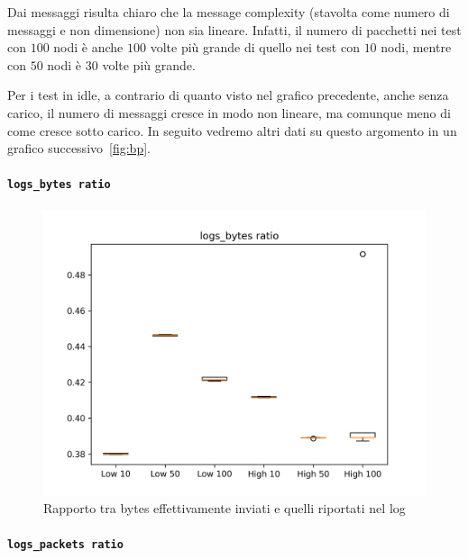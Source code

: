 \documentclass[12pt, a4paper]{article}
\begin{document}
Dai messaggi risulta chiaro che la message complexity (stavolta come numero di messaggi e non dimensione) non sia lineare. Infatti, il numero di pacchetti nei test con $100$ nodi è anche $100$ volte più grande di quello nei test con $10$ nodi, mentre con $50$ nodi è $30$ volte più grande.

Per i test in idle, a contrario di quanto visto nel grafico precedente, anche senza carico, il numero di messaggi cresce in modo non lineare, ma comunque meno di come cresce sotto carico. In seguito vedremo altri dati su questo argomento in un grafico successivo~\ref{fig:bp}.

\paragraph{\lstinline{logs_bytes ratio}}

\begin{figure}[H]
    \includegraphics[width=\linewidth]{graphs/logs_bytes ratio.png}
    \caption{Rapporto tra bytes effettivamente inviati e quelli riportati nel log}
    \label{fig:lbr}
\end{figure}

\paragraph{\lstinline{logs_packets ratio}}
\end{document}
